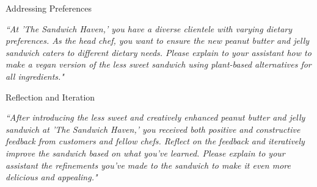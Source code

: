 \begin{frame}[plain]
\centering
{\Huge  Addressing Preferences}

\vspace{2em}
{\Large \em ``At 'The Sandwich Haven,' you have a diverse clientele with varying dietary preferences. As the head chef, you want to ensure the new peanut butter and jelly sandwich caters to different dietary needs. Please explain to your assistant how to make a vegan version of the less sweet sandwich using plant-based alternatives for all ingredients."}

\end{frame}

\begin{frame}[plain]
\centering
{\Huge  Reflection and Iteration}

\vspace{2em}
{\Large \em ``After introducing the less sweet and creatively enhanced peanut butter and jelly sandwich at 'The Sandwich Haven,' you received both positive and constructive feedback from customers and fellow chefs. Reflect on the feedback and iteratively improve the sandwich based on what you've learned. Please explain to your assistant the refinements you've made to the sandwich to make it even more delicious and appealing."}

\end{frame}
